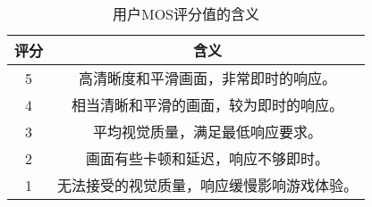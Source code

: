 \begin{table}[ht]
    \caption{用户MOS评分值的含义}
    \renewcommand\arraystretch{1.25}
    \centering
    \begin{tabular}{@{}cc@{}}
\toprule
评分 & 含义                                                           \\ \midrule
5     & 高清晰度和平滑画面，非常即时的响应。                          \\
4     & 相当清晰和平滑的画面，较为即时的响应。                        \\
3     & 平均视觉质量，满足最低响应要求。                              \\
2     & 画面有些卡顿和延迟，响应不够即时。                            \\
1     & 无法接受的视觉质量，响应缓慢影响游戏体验。                   \\ \bottomrule
\end{tabular}
    \label{tab:mos_rate}
\end{table}
